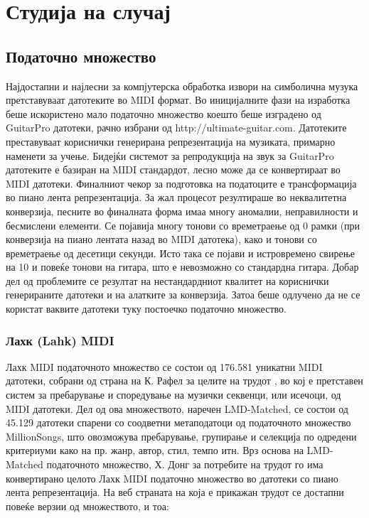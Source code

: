 \chapter{Студија на случај}
\label{ch:studija}

\section{Податочно множество}

Најдостапни и најлесни за компјутерска обработка извори на симболична музука претставуваат датотеките во MIDI формат. Во иницијалните фази на изработка беше искористено мало податочно множество коешто беше изградено од GuitarPro датотеки, рачно избрани од http://ultimate-guitar.com. Датотеките преставуваат кориснички генерирана репрезентација на музиката, примарно наменети за учење. Бидејќи системот за репродукција на звук за GuitarPro датотеките е базиран на MIDI стандардот, лесно може да се конвертираат во MIDI датотеки. Финалниот чекор за подготовка на податоците е трансформација во пиано лента репрезентација. За жал процесот резултираше во неквалитетна конверзија, песните во финалната форма имаа многу аномалии, неправилности и бесмислени елементи. Се појавија многу тонови со времетраење од 0 рамки (при конверзија на пиано лентата назад во MIDI датотека), како и тонови со времетраење од десетици секунди. Исто така се појави и истровремено свирење на 10 и повеќе тонови на гитара, што е невозможно со стандардна гитара. Добар дел од проблемите се резултат на нестандардниот квалитет на кориснички генерираните датотеки и на алатките за конверзија. Затоа беше одлучено да не се користат ваквите датотеки туку постоечко податочно множество.

\subsection{Лахк (Lahk) MIDI}

Лахк MIDI податочното множество се состои од 176.581 уникатни MIDI датотеки, собрани од страна на К. Рафел за целите на трудот \cite{Raffel2016}, во кој е претставен систем за пребарување и споредување на музички секвенци, или исечоци, од MIDI датотеки. Дел од ова множеството, наречен LMD-Matched, се состои од 45.129 датотеки спарени со соодветни метаподатоци од податочното множество MillionSongs, што овозможува пребарување, групирање и селекција по одредени критериуми како на пр. жанр, автор, стил, темпо итн. 
Врз основа на LMD-Matched податочното множество, Х. Донг за потребите на трудот \cite{Dong2017} го има конвертирано целото Лахк MIDI податочно множество во датотеки со пиано лента репрезентација. На веб страната на која е прикажан трудот се достапни повеќе верзии од множеството, и тоа:

